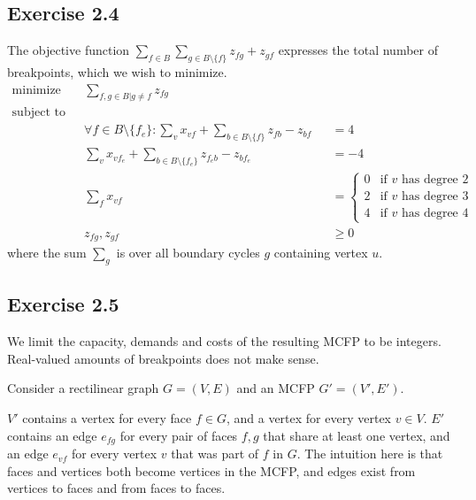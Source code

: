 \subsection{Exercise 2.4}
%
The objective function $\sum_{f\in B} \sum_{g\in B\setminus\{f\}} z_{fg} +
z_{gf}$ expresses the total number of breakpoints, which we wish to minimize.
\begin{align*}
  \text{minimize} \quad & \sum_{f,g\in B|g \neq f} z_{fg} &  \\
  \text{subject to} \quad & & \\
  & \forall f \in B\setminus \{f_e\} : \sum_{v} x_{vf} + \sum_{b\in B\setminus \{f\}} z_{fb} - z_{bf} &&= 4 \\
  & \sum_{v} x_{v f_e} + \sum_{b\in B\setminus \{f_e\}} z_{f_e b} - z_{b f_e} &&= -4 \\
  & \sum_{f} x_{vf} &&=
      \begin{cases}
        0 & \text{if $v$ has degree 2}\\
        2 & \text{if $v$ has degree 3}\\
        4 & \text{if $v$ has degree 4}
      \end{cases}\\
  & z_{fg}, z_{gf} && \geq 0
\end{align*}
%
where the sum $\sum_{g}$ is over all boundary cycles $g$ containing vertex $u$.
%
\subsection{Exercise 2.5}
%
We limit the capacity, demands and costs of the resulting MCFP to be integers. Real-valued
amounts of breakpoints does not make sense.

Consider a rectilinear graph $G=(V,E)$ and an MCFP $G' = (V',E')$.

$V'$ contains a vertex for every face $f \in G$, and a vertex for every vertex
$v \in V$. $E'$ contains an edge $e_{fg}$ for every pair of faces $f,g$ that
share at least one vertex, and an edge $e_{vf}$ for every vertex $v$ that was
part of $f$ in $G$. The intuition here is that faces and vertices both become
vertices in the MCFP, and edges exist from vertices to faces and from faces to
faces.

